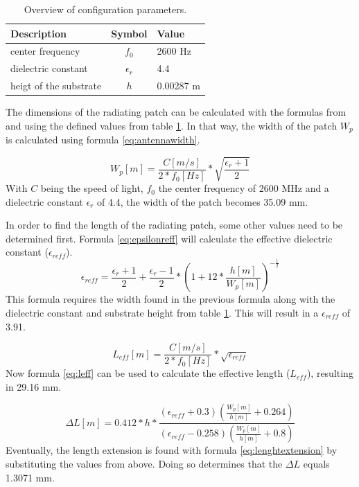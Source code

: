 \begin{table}[h!]
\centering
\begin{tabular}{|l|c|l|}
\hline
 Description            & Symbol          & Value         \\    \hline
 center frequency       & $f_0$           & 2600 Hz       \\ 
 \gls{dielectric constant}    & $\epsilon_r$    & 4.4         \\ 
 heigt of the substrate & $h$             & 0.00287 m    \\ \hline
\end{tabular}
\caption{Overview of configuration parameters.}
\label{table:antennaparas}
\end{table}

The dimensions of the radiating patch can be calculated with the formulas from \cite{J14_antennadesign} and \cite{J15_antennadesign}
using the defined values from table \ref{table:antennaparas}. In that way, the width of the patch $W_{p}$ is calculated using formula \ref{eq:antennawidth}.

\begin{equation} 
W_{p} [m] = \frac{C [m/s]}{2*f_0 [Hz]}*\sqrt{\frac{\epsilon_r+1}{2}}
\label{eq:antennawidth}
\end{equation}
With $C$ being the speed of light, $f_0$ the center frequency of 2600 MHz and a \gls{dielectric constant} $\epsilon_r$ of 4.4, the width of the patch becomes 35.09 mm.

In order to find the length of the radiating patch, some other values need to be determined first. Formula \ref{eq:epsilonreff} will
calculate the effective \gls{dielectric constant} ($\epsilon_{reff}$).
\begin{equation} 
\epsilon_{reff} = \frac{\epsilon_r+1}{2}+  \frac{\epsilon_r-1}{2} * \left(1+12*\frac{h [m]}{W_{p} [m] }\right)^{-\frac{1}{2}}
\label{eq:epsilonreff}
\end{equation}
This formula requires the width found in the previous formula along with the \gls{dielectric constant} and substrate height from table \ref{table:antennaparas}.
This will result in a $\epsilon_{reff}$ of 3.91.

\begin{equation} 
L_{eff} [m] = \frac{C [m/s]}{2*f_0 [Hz]}*\sqrt{\epsilon_{reff}}
\label{eq:leff}
\end{equation}
Now formula \ref{eq:leff} can be used to calculate the effective length ($L_{eff}$), resulting in 29.16 mm.

\begin{equation} 
\Delta L [m]= 0.412*h*\frac{(\epsilon_{reff}+0.3)\left(\frac{W_{p} [m]}{h [m]}+0.264\right)}{\left(\epsilon_{reff}-0.258\right)\left(\frac{W_{p} [m]}{h [m]}+0.8\right)}
\label{eq:lenghtextension}
\end{equation}
Eventually, the length extension is found with formula \ref{eq:lenghtextension} by substituting the values from above.
Doing so determines that the $\Delta L$ equals 1.3071 mm.


